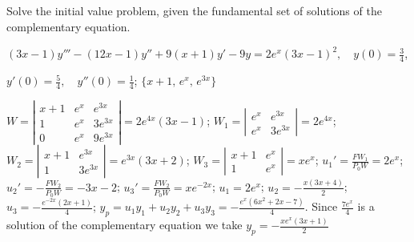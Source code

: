 \documentclass{ximera}
\begin{document}
\begin{problem}\label{exer:9.4.28}
Solve the
initial value problem, given the fundamental set of solutions of the complementary equation.

$(3x-1)y'''-(12x-1)y''+9(x+1)y'-9y=2e^x(3x-1)^2, \quad  y(0)=\frac{3}{4}$,

$y'(0)=\frac{5}{4}, \quad  y''(0)=\frac{1}{4}$;\quad
$\{x+1,\,e^x,\,e^{3x}\}$

\begin{solution}
$W=\left|\begin{array}{cccc}
x+1&e^x&e^{3x}\\1&e^x&3e^{3x}\\0&e^x&9e^{3x}
\end{array}\right|=2e^{4x}(3x-1)$;
$W_1=\left|\begin{array}{cccc}
e^x&e^{3x}\\e^x&3e^{3x}\end{array}\right|=2e^{4x}$;
$W_2=\left|\begin{array}{cccc}
x+1&e^{3x}\\1&3e^{3x}\end{array}\right|=e^{3x}(3x+2)$;
$W_3=\left|\begin{array}{cccc}
x+1&e^x\\1&e^x\end{array}\right|=xe^x$;
$u_1'=\frac{FW_1}{P_0W}=2e^x$;
$u_2'=-\frac{FW_2}{P_0W}=-3x-2$;
$u_3'=\frac{FW_2}{P_0W}= xe^{-2x}$;
$u_1=2e^x$;
$u_2=-\frac{x(3x+4)}{2}$;
$u_3=-\frac{e^{-2x}(2x+1)}{4}$;
$y_p=u_1y_1+u_2y_2+u_3y_3=-\frac{e^x(6x^2+2x-7)}{4}$.
Since $\frac{7e^x}{4}$ is a solution of the complementary
equation we take
$y_p=-\frac{xe^x(3x+1)}{2}$


\end{solution}
\end{problem}
\end{document}
